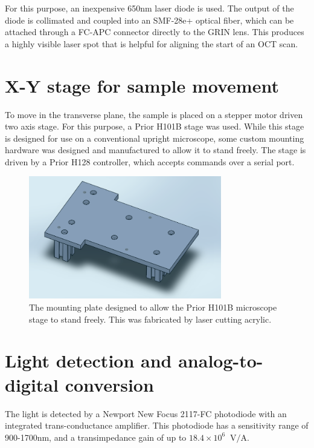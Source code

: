 For this purpose, an inexpensive 650nm laser diode is used. The output of the diode is collimated and coupled into an SMF-28e+ optical fiber, which can be attached through a FC-APC connector directly to the GRIN lens. This produces a highly visible laser spot that is helpful for aligning the start of an OCT scan.


\section{X-Y stage for sample movement}

To move in the transverse plane, the sample is placed on a stepper motor driven two axis stage. For this purpose, a Prior H101B stage was used. While this stage is designed for use on a conventional upright microscope, some custom mounting hardware was designed and manufactured to allow it to stand freely. The stage is driven by a Prior H128 controller, which accepts commands over a serial port.

\begin{figure}[h!]
\centering
\includegraphics[width=0.75\textwidth]{Images/Alignment/x-y-mount.png}
\caption{The mounting plate designed to allow the Prior H101B microscope stage to stand freely. This was fabricated by laser cutting acrylic.}
\end{figure}

\section{Light detection and analog-to-digital conversion}

The light is detected by a Newport New Focus 2117-FC photodiode with an integrated trans-conductance amplifier. This photodiode has a sensitivity range of 900-1700nm, and a transimpedance gain of up to $18.4 \times 10^6 \;\; \mathrm{V}/\mathrm{A}$.

